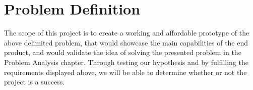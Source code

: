 \section{Problem Definition}

The scope of this project is to create a working and affordable prototype of the above delimited problem, that would showcase the main capabilities of the end product, and would validate the idea of solving the presented problem in the Problem Analysis chapter.
Through testing our hypothesis and by fulfilling the requirements displayed above, we will be able to determine whether or not the project is a success.